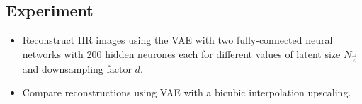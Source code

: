
\subsection{Experiment}
\label{sub:experiments}

\begin{itemize}
	\item Reconstruct HR images using the VAE with two fully-connected neural networks with $200$ hidden neurones each for different values of latent size $N_{\vec{z}}$ and downsampling factor $d$.
	\item Compare reconstructions using VAE with a bicubic interpolation upscaling.
\end{itemize}
